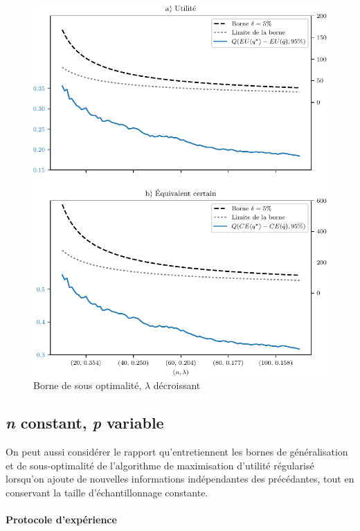 \begin{figure}[h!]
  \centering
  \includegraphics[width=1\textwidth]{../../experiments/fig/bound_errso_lambda.pdf}
  \caption{Borne de sous optimalité, $\lambda$ décroissant}
  \label{fig_bound_errso_lambda}
\end{figure}


\clearpage

\subsection{\textit{n} constant, \textit{p} variable}
\label{emp:pvar}

On peut aussi considérer le rapport qu'entretiennent les bornes de généralisation et de
sous-optimalité de l'algorithme de maximisation d'utilité régularisé lorsqu'on ajoute de
nouvelles informations indépendantes des précédantes, tout en conservant la taille
d'échantillonnage constante.

\paragraph{Protocole d'expérience}

